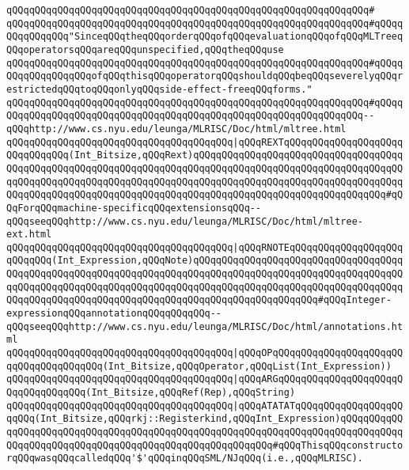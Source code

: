\verb|qQQqqQQqqQQqqQQqqQQqqQQqqQQqqQQqqQQqqQQqqQQqqQQqqQQqqQQqqQQqqQQq#|\newline
\verb|qQQqqQQqqQQqqQQqqQQqqQQqqQQqqQQqqQQqqQQqqQQqqQQqqQQqqQQqqQQqqQQq#qQQqqQQqqQQqqQQq"SinceqQQqtheqQQqorderqQQqofqQQqevaluationqQQqofqQQqMLTreeqQQqoperatorsqQQqareqQQqunspecified,qQQqtheqQQquse|\newline
\verb|qQQqqQQqqQQqqQQqqQQqqQQqqQQqqQQqqQQqqQQqqQQqqQQqqQQqqQQqqQQqqQQq#qQQqqQQqqQQqqQQqqQQqofqQQqthisqQQqoperatorqQQqshouldqQQqbeqQQqseverelyqQQqrestrictedqQQqtoqQQqonlyqQQqside-effect-freeqQQqforms."|\newline
\verb|qQQqqQQqqQQqqQQqqQQqqQQqqQQqqQQqqQQqqQQqqQQqqQQqqQQqqQQqqQQqqQQq#qQQqqQQqqQQqqQQqqQQqqQQqqQQqqQQqqQQqqQQqqQQqqQQqqQQqqQQqqQQqqQQqqQQq--qQQqhttp://www.cs.nyu.edu/leunga/MLRISC/Doc/html/mltree.html|\newline
\newline
\verb|qQQqqQQqqQQqqQQqqQQqqQQqqQQqqQQqqQQqqQQq|\verb#|qQQqREXTqQQqqQQqqQQqqQQqqQQqqQQqqQQqqQQq(Int_Bitsize,qQQqRext)qQQqqQQqqQQqqQQqqQQqqQQqqQQqqQQqqQQqqQQqqQQqqQQqqQQqqQQqqQQqqQQqqQQqqQQqqQQqqQQqqQQqqQQqqQQqqQQqqQQqqQQqqQQqqQQqqQQqqQQqqQQqqQQqqQQqqQQqqQQqqQQqqQQqqQQqqQQqqQQqqQQqqQQqqQQqqQQqqQQqqQQqqQQqqQQqqQQqqQQqqQQqqQQqqQQqqQQqqQQqqQQqqQQqqQQqqQQqqQQqqQQq#\verb|#qQQqForqQQqmachine-specificqQQqextensionsqQQq--qQQqseeqQQqhttp://www.cs.nyu.edu/leunga/MLRISC/Doc/html/mltree-ext.html|\newline
\verb|qQQqqQQqqQQqqQQqqQQqqQQqqQQqqQQqqQQqqQQq|\verb#|qQQqRNOTEqQQqqQQqqQQqqQQqqQQqqQQqqQQq(Int_Expression,qQQqNote)qQQqqQQqqQQqqQQqqQQqqQQqqQQqqQQqqQQqqQQqqQQqqQQqqQQqqQQqqQQqqQQqqQQqqQQqqQQqqQQqqQQqqQQqqQQqqQQqqQQqqQQqqQQqqQQqqQQqqQQqqQQqqQQqqQQqqQQqqQQqqQQqqQQqqQQqqQQqqQQqqQQqqQQqqQQqqQQqqQQqqQQqqQQqqQQqqQQqqQQqqQQqqQQqqQQqqQQqqQQqqQQqqQQqqQQq#\verb|#qQQqInteger-expressionqQQqannotationqQQqqQQqqQQq--qQQqseeqQQqhttp://www.cs.nyu.edu/leunga/MLRISC/Doc/html/annotations.html|\newline
\newline
\verb|qQQqqQQqqQQqqQQqqQQqqQQqqQQqqQQqqQQqqQQq|\verb#|qQQqOPqQQqqQQqqQQqqQQqqQQqqQQqqQQqqQQqqQQqqQQq(Int_Bitsize,qQQqOperator,qQQqList(Int_Expression))#\newline
\verb|qQQqqQQqqQQqqQQqqQQqqQQqqQQqqQQqqQQqqQQq|\verb#|qQQqARGqQQqqQQqqQQqqQQqqQQqqQQqqQQqqQQqqQQq(Int_Bitsize,qQQqRef(Rep),qQQqString)#\newline
\verb|qQQqqQQqqQQqqQQqqQQqqQQqqQQqqQQqqQQqqQQq|\verb#|qQQqATATATqQQqqQQqqQQqqQQqqQQqqQQq(Int_Bitsize,qQQqrkj::Registerkind,qQQqInt_Expression)qQQqqQQqqQQqqQQqqQQqqQQqqQQqqQQqqQQqqQQqqQQqqQQqqQQqqQQqqQQqqQQqqQQqqQQqqQQqqQQqqQQqqQQqqQQqqQQqqQQqqQQqqQQqqQQqqQQqqQQqqQQqqQQq#\verb|#qQQqThisqQQqconstructorqQQqwasqQQqcalledqQQq'$'qQQqinqQQqSML/NJqQQq(i.e.,qQQqMLRISC).|\newline
